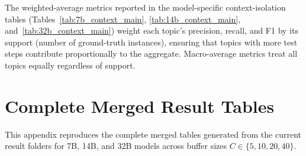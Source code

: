 The weighted-average metrics reported in the model-specific context-isolation tables (Tables~\ref{tab:7b_context_main}, \ref{tab:14b_context_main}, and~\ref{tab:32b_context_main}) weight each topic's precision, recall, and F1 by its support (number of ground-truth instances), ensuring that topics with more test steps contribute proportionally to the aggregate. Macro-average metrics treat all topics equally regardless of support.


\section{Complete Merged Result Tables}\label{secA4}

This appendix reproduces the complete merged tables generated from the current result folders for 7B, 14B, and 32B models across buffer sizes $C \in \{5,10,20,40\}$.

